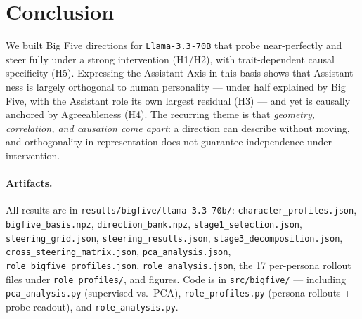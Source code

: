\documentclass[11pt]{article}
\begin{document}
\section{Conclusion}
We built Big Five directions for \texttt{Llama-3.3-70B} that probe near-perfectly
and steer fully under a strong intervention (H1/H2), with trait-dependent causal
specificity (H5). Expressing the Assistant Axis in this basis shows that
Assistant-ness is largely orthogonal to human personality --- under half explained
by Big Five, with the Assistant role its own largest residual (H3) --- and yet is
causally anchored by Agreeableness (H4). The recurring theme is that
\emph{geometry, correlation, and causation come apart}: a direction can describe
without moving, and orthogonality in representation does not guarantee
independence under intervention.

\paragraph{Artifacts.} All results are in
\texttt{results/bigfive/llama-3.3-70b/}: \texttt{character\_profiles.json},
\texttt{bigfive\_basis.npz}, \texttt{direction\_bank.npz},
\texttt{stage1\_selection.json}, \texttt{steering\_grid.json},
\texttt{steering\_results.json}, \texttt{stage3\_decomposition.json},
\texttt{cross\_steering\_matrix.json}, \texttt{pca\_analysis.json},
\texttt{role\_bigfive\_profiles.json}, \texttt{role\_analysis.json}, the 17
per-persona rollout files under \texttt{role\_profiles/}, and figures. Code is in
\texttt{src/bigfive/} --- including \texttt{pca\_analysis.py} (supervised vs.\ PCA),
\texttt{role\_profiles.py} (persona rollouts + probe readout), and
\texttt{role\_analysis.py}.
\end{document}
